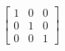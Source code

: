 \documentclass[preview]{standalone}
\begin{document}
\begin{align*}
\begin{bmatrix} 1 & 0 & 0 \\ 0 & 1 & 0 \\ 0 & 0 & 1 \end{bmatrix}
\end{align*}
\end{document}
